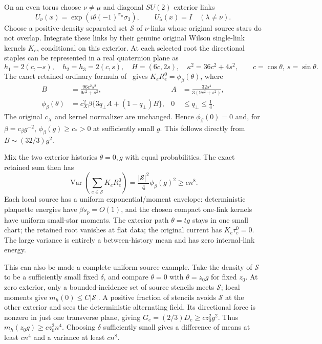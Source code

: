\documentclass[11pt,letterpaper]{article}
\theoremstyle{remark}\newtheorem{remark}[theorem]{Remark}
\newcommand{\Var}{\operatorname{Var}}\newcommand{\Cov}{\operatorname{Cov}}
\newcommand{\cB}{c_\beta}\newcommand{\dd}{\,d}
\begin{document}
On an even torus choose \(\nu\ne\mu\) and diagonal \(SU(2)\) exterior links
\[
 U_\nu(x)=\exp(i\theta(-1)^{x_\mu}\sigma_3),\qquad
 U_\lambda(x)=I\quad(\lambda\ne\nu).
\]
Choose a positive-density separated set \(\mathcal S\) of \(\nu\)-links whose original source stars do not overlap. Integrate these links by their genuine original Wilson single-link kernels \(K_e\), conditional on this exterior. At each selected root the directional staples can be represented in a real quaternion plane as
\[
 h_1=2(c,-s),\quad h_2=h_3=2(c,s),\quad
 H=(6c,2s),\quad \kappa^2=36c^2+4s^2,
 \qquad c=\cos\theta,\ s=\sin\theta.
\]
The exact retained ordinary formula of~\cite[\S5]{RS} gives \(K_eR_e^0=\phi_\beta(\theta)\), where
\begin{align}\label{eq:phi}
 B&=\frac{96c^2s^2}{9c^2+s^2},
 &A&=\frac{32s^4}{3(9c^2+s^2)},\\
 \phi_\beta(\theta)&=c_X^2\beta\{3q_\perp A+(1-q_\perp)B\},
 &0&\le q_\perp\le\tfrac14.\nonumber
\end{align}
The original \(c_X\) and kernel normalizer are unchanged. Hence \(\phi_\beta(0)=0\) and, for \(\beta=\cB g^{-2}\), \(\phi_\beta(g)\ge c_*>0\) at sufficiently small \(g\). This follows directly from \(B\sim(32/3)g^2\).

Mix the two exterior histories \(\theta=0,g\) with equal probabilities. The exact retained sum then has
\begin{equation}\label{eq:coherent}
 \Var\left(\sum_{e\in\mathcal S}K_eR_e^0\right)
 =\frac{|\mathcal S|^2}{4}\phi_\beta(g)^2\ge cn^8.
\end{equation}
Each local source has a uniform exponential/moment envelope: deterministic plaquette energies have \(\beta s_p=O(1)\), and the chosen compact one-link kernels have uniform small-star moments. The exterior path \(\theta=tg\) stays in one small chart; the retained root vanishes at flat data; the original current has \(K_e\tau_e^0=0\). The large variance is entirely a between-history mean and has zero internal-link energy.

This can also be made a complete uniform-source example. Take the density of \(\mathcal S\) to be a sufficiently small fixed \(\delta\), and compare \(\theta=0\) with \(\theta=z_0g\) for fixed \(z_0\). At zero exterior, only a bounded-incidence set of source stencils meets \(\mathcal S\); local moments give \(m_h(0)\le C|\mathcal S|\). A positive fraction of stencils avoids \(\mathcal S\) at the other exterior and sees the deterministic alternating field. Its directional force is nonzero in just one transverse plane, giving \(G_e=(2/3)D_e\ge c z_0^2g^2\). Thus \(m_h(z_0g)\ge c z_0^2n^4\). Choosing \(\delta\) sufficiently small gives a difference of means at least \(cn^4\) and a variance at least \(cn^8\).
\end{document}
